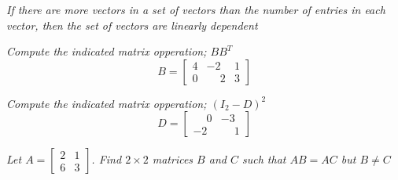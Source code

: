 \documentclass[12pt,letterpaper]{hmcpset}
\begin{document}


\begin{problem}[Ch 2.1j]
\textit{If there are more vectors in a set of vectors than the number of entries in each vector, then the set of vectors are linearly dependent}
\end{problem}

\begin{solution}

\end{solution}

\newpage

\begin{problem}[3.1.8]
\textit{ Compute the indicated matrix opperation; $BB^T$}
$$B=\begin{bmatrix}
4&-2&1\\0&\phantom-2&3
\end{bmatrix}
$$
\end{problem}

\begin{solution}

\end{solution}

\newpage

\begin{problem}[3.1.16]
\textit{ Compute the indicated matrix opperation; $(I_2-D)^2$}
$$D=\begin{bmatrix}
\phantom-0&-3\\-2&\phantom-1
\end{bmatrix}$$
\end{problem}

\begin{solution}

\end{solution}

\newpage

\begin{problem}[3.1.18]
\textit{Let $A=\begin{bmatrix}
2&1\\6&3
\end{bmatrix}$. Find $2\times 2$ matrices $B$ and $C$ such that $AB= AC$ but $B \neq C$}
\end{problem}

\begin{solution}

\end{solution}
\end{document}
